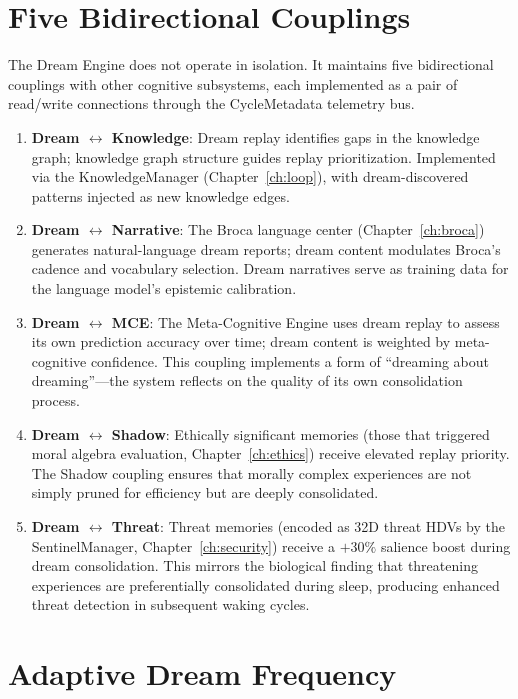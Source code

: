 \documentclass[12pt]{book}
\begin{document}
\section{Five Bidirectional Couplings}

The Dream Engine does not operate in isolation. It maintains five bidirectional couplings with other cognitive subsystems, each implemented as a pair of read/write connections through the CycleMetadata telemetry bus.

\begin{enumerate}[label=\arabic*.]
  \item \textbf{Dream $\leftrightarrow$ Knowledge}: Dream replay identifies gaps in the knowledge graph; knowledge graph structure guides replay prioritization. Implemented via the KnowledgeManager (Chapter~\ref{ch:loop}), with dream-discovered patterns injected as new knowledge edges.
  \item \textbf{Dream $\leftrightarrow$ Narrative}: The Broca language center (Chapter~\ref{ch:broca}) generates natural-language dream reports; dream content modulates Broca's cadence and vocabulary selection. Dream narratives serve as training data for the language model's epistemic calibration.
  \item \textbf{Dream $\leftrightarrow$ MCE}: The Meta-Cognitive Engine uses dream replay to assess its own prediction accuracy over time; dream content is weighted by meta-cognitive confidence. This coupling implements a form of ``dreaming about dreaming''---the system reflects on the quality of its own consolidation process.
  \item \textbf{Dream $\leftrightarrow$ Shadow}: Ethically significant memories (those that triggered moral algebra evaluation, Chapter~\ref{ch:ethics}) receive elevated replay priority. The Shadow coupling ensures that morally complex experiences are not simply pruned for efficiency but are deeply consolidated.
  \item \textbf{Dream $\leftrightarrow$ Threat}: Threat memories (encoded as 32D threat HDVs by the SentinelManager, Chapter~\ref{ch:security}) receive a $+30\%$ salience boost during dream consolidation. This mirrors the biological finding that threatening experiences are preferentially consolidated during sleep, producing enhanced threat detection in subsequent waking cycles.
\end{enumerate}

\section{Adaptive Dream Frequency}
\end{document}
